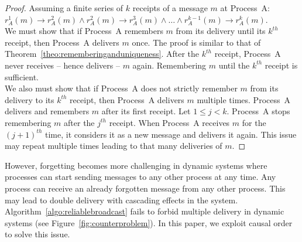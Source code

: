 \begin{proof}
  Assuming a finite series of $k$ receipts of a message $m$ at Process~A:
  $r^1_A(m) \rightarrow r^2_A(m) \wedge r^2_A(m) \rightarrow r^3_A(m) \wedge
  \ldots \wedge r^{k-1}_A(m) \rightarrow r^k_A(m)$. \\
  We must show that if Process~A remembers $m$ from its delivery until its
  $k^{th}$ receipt, then Process~A delivers $m$ once. The proof is similar to
  that of Theorem~\ref{theo:rememberinganduniqueness}. After the $k^{th}$
  receipt, Process~A never receives -- hence delivers -- $m$ again. Remembering
  $m$ until the $k^{th}$ receipt is sufficient.\\
  We also must show that if Process~A does not strictly remember $m$ from its
  delivery to its $k^{th}$ receipt, then Process~A delivers $m$ multiple
  times. Process~A delivers and remembers $m$ after its first receipt. Let
  $1\leq j<k$. Process~A stops remembering $m$ after the $j^{th}$ receipt. When
  Process~A receives $m$ for the $(j+1)^{th}$ time, it considers it as a new
  message and delivers it again. This issue may repeat multiple times leading to
  that many deliveries of $m$.
\end{proof}

However, forgetting becomes more challenging in dynamic systems where processes
can start sending messages to any other process at any time. Any process can
receive an already forgotten message from any other process. This may lead to
double delivery with cascading effects in the
system. Algorithm~\ref{algo:reliablebroadcast} fails to forbid multiple delivery
in dynamic systems (see Figure~\ref{fig:counterproblem}). In this paper, we
exploit causal order to solve this issue.




